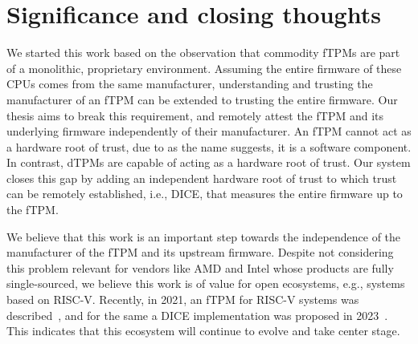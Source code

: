 
\section{Significance and closing thoughts}\label{sec:significance}

We started this work based on the observation that commodity \acp{fTPM} are part of a monolithic, proprietary environment.
Assuming the entire firmware of these CPUs comes from the same manufacturer, understanding and trusting the manufacturer of an \ac{fTPM} can be extended to trusting the entire firmware.
Our thesis aims to break this requirement, and remotely attest the \ac{fTPM} and its underlying firmware independently of their manufacturer.
An \ac{fTPM} cannot act as a hardware root of trust, due to as the name suggests, it is a software component.
In contrast, \acp{dTPM} are capable of acting as a hardware root of trust.
Our system closes this gap by adding an independent hardware root of trust to which trust can be remotely established, i.e., \ac{DICE}, that measures the entire firmware up to the \ac{fTPM}.



We believe that this work is an important step towards the independence of the manufacturer of the \ac{fTPM} and its upstream firmware. %
Despite not considering this problem relevant for vendors like AMD and Intel whose products are fully single-sourced, we believe this work is of value for open ecosystems, e.g., systems based on RISC-V\@.
Recently, in 2021, an \ac{fTPM} for RISC-V systems was described~\cite{Boubakri2021}, and for the same a \ac{DICE} implementation was proposed in 2023~\cite{Bravi2023}.
This indicates that this ecosystem will continue to evolve and take center stage.

